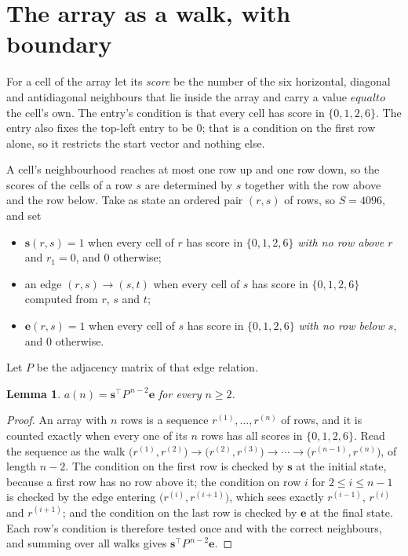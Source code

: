 \documentclass[11pt,a4paper]{article}
\theoremstyle{plain}
\newtheorem{lemma}[theorem]{Lemma}
\theoremstyle{definition}
\begin{document}
\section{The array as a walk, with boundary}

For a cell of the array let its \emph{score} be the number of the six horizontal, diagonal and antidiagonal neighbours that lie inside
the array and carry a value $equal to$ the cell's own. The entry's condition is that every cell
has score in $\{0,1,2,6\}$. The entry also fixes the top-left entry to be $0$; that is a condition on the first row alone, so it restricts the start vector and nothing else.

A cell's neighbourhood reaches at most one row up and one row down, so the scores of the
cells of a row $s$ are determined by $s$ together with the row above and the row below.
Take as state an ordered pair $(r,s)$ of rows, so $S=4096$, and set
\begin{itemize}
\item $\mathbf{s}(r,s)=1$ when every cell of $r$ has score in $\{0,1,2,6\}$ \emph{with no row
above $r$} and $r_1=0$, and $0$ otherwise;
\item an edge $(r,s)\to(s,t)$ when every cell of $s$ has score in $\{0,1,2,6\}$ computed from
$r$, $s$ and $t$;
\item $\mathbf{e}(r,s)=1$ when every cell of $s$ has score in $\{0,1,2,6\}$ \emph{with no row
below $s$}, and $0$ otherwise.
\end{itemize}
Let $P$ be the adjacency matrix of that edge relation.

\begin{lemma}\label{lem:walk}
$a(n)=\mathbf{s}^{\!\top}P^{\,n-2}\mathbf{e}$ for every $n\ge2$.
\end{lemma}

\begin{proof}
An array with $n$ rows is a sequence $r^{(1)},\dots,r^{(n)}$ of rows, and it is counted
exactly when every one of its $n$ rows has all scores in $\{0,1,2,6\}$. Read the sequence as the
walk $\bigl(r^{(1)},r^{(2)}\bigr)\to\bigl(r^{(2)},r^{(3)}\bigr)\to\cdots\to
\bigl(r^{(n-1)},r^{(n)}\bigr)$, of length $n-2$. The condition on the first row is
checked by $\mathbf{s}$ at the initial state, because a first row has no row above it; the
condition on row $i$ for $2\le i\le n-1$ is checked by the edge entering
$\bigl(r^{(i)},r^{(i+1)}\bigr)$, which sees exactly $r^{(i-1)}$, $r^{(i)}$ and
$r^{(i+1)}$; and the condition on the last row is checked by $\mathbf{e}$ at the final
state. Each row's condition is therefore tested once and with the correct neighbours, and
summing over all walks gives $\mathbf{s}^{\!\top}P^{\,n-2}\mathbf{e}$.
\end{proof}
\end{document}
